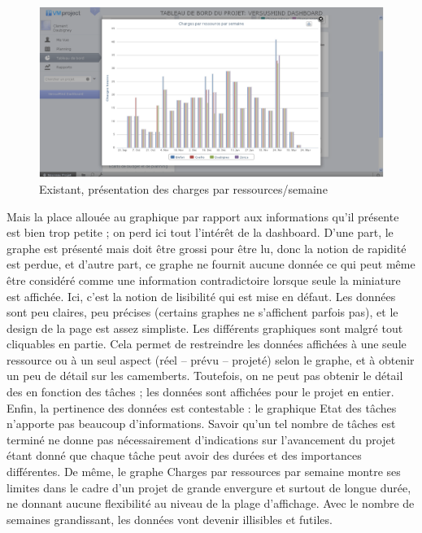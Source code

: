 \documentclass[12pt]{report}
\begin{document}
\begin{figure}[H]
	\centering
	\includegraphics[width=1\textwidth]{pictures/clement/c1.png}
	\caption{Existant, présentation des charges par ressources/semaine}
	\label{c1}
\end{figure}
  
  Mais la place allouée au graphique par rapport aux informations qu’il présente est bien trop petite ; on perd ici tout l’intérêt de la dashboard. D’une part, le graphe est présenté mais doit être grossi pour être lu, donc la notion de rapidité est perdue, et d’autre part, ce graphe ne fournit aucune donnée ce qui peut même être considéré comme une information contradictoire lorsque seule la miniature est affichée. Ici, c’est la notion de lisibilité qui est mise en défaut.
Les données sont peu claires, peu précises (certains graphes ne s’affichent parfois pas), et le design de la page est assez simpliste. Les différents graphiques sont malgré tout cliquables en partie. Cela permet de restreindre les données affichées à une seule ressource ou à un seul aspect (réel – prévu – projeté) selon le graphe, et à obtenir un peu de détail sur les camemberts. Toutefois, on ne peut pas obtenir le détail des en fonction des tâches ; les données sont affichées pour le projet en entier. \\
  
Enfin, la pertinence des données est contestable : le graphique Etat des tâches n’apporte pas beaucoup d’informations. Savoir qu’un tel nombre de tâches est terminé ne donne pas nécessairement d’indications sur l’avancement du projet étant donné que chaque tâche peut avoir des durées et des importances différentes. De même, le graphe Charges par ressources par semaine montre ses limites dans le cadre d’un projet de grande envergure et surtout de longue durée, ne donnant aucune flexibilité au niveau de la plage d’affichage. Avec le nombre de semaines grandissant, les données vont devenir illisibles et futiles.\\
  
\end{document}
